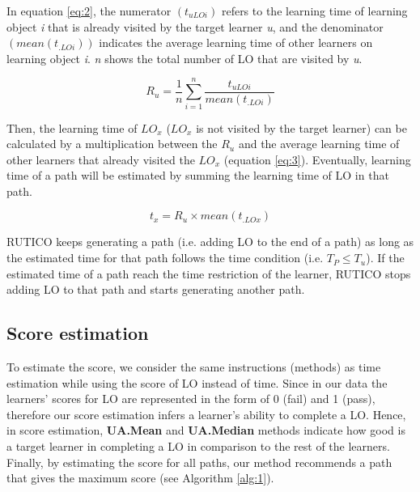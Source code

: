 \documentclass{sig-alternate}
\begin{document}
In equation \ref{eq:2}, the numerator $(t_{uLOi})$ refers to the learning time of learning object \textit{i} that is already visited by the target learner \textit{u}, and the denominator $(mean(t_{.LOi}))$ indicates the average learning time of other learners on learning object \textit{i}. \textit{n} shows the total number of LO that are visited by \textit{u}.

\begin{equation} \label{eq:2}
R_u = \frac{1}{n} \sum_{i=1}^n \frac{t_{uLOi}}{mean(t_{.LOi})}
\end{equation}

Then, the learning time of $LO_x$ ($LO_x$ is not visited by the target learner) can be calculated by a multiplication between the $R_u$ and the average learning time of other learners that already visited the $LO_x$ (equation \ref{eq:3}). Eventually, learning time of a path will be estimated by summing the learning time of LO in that path.

\begin{equation} \label{eq:3}
t_x = R_u \times mean(t_{.LOx})
\end{equation}

RUTICO keeps generating a path (i.e. adding LO to the end of a path) as long as the estimated time for that path follows the time condition (i.e. $T_P \leq T_u$). If the estimated time of a path reach the time restriction of the learner, RUTICO stops adding LO to that path and starts generating another path.

\subsection{Score estimation}
\label{subsec:scoreestimation}
\noindent To estimate the score, we consider the same instructions (methods) as time estimation while using the score of LO instead of time. Since in our data the learners’ scores for LO are represented in the form of 0 (fail) and 1 (pass), therefore our score estimation infers a learner’s ability to complete a LO. Hence, in score estimation, \textbf{UA.Mean} and \textbf{UA.Median} methods indicate how good is a target learner in completing a LO in comparison to the rest of the learners. Finally, by estimating the score for all paths, our method recommends a path that gives the maximum score (see Algorithm \ref{alg:1}).
\end{document}
